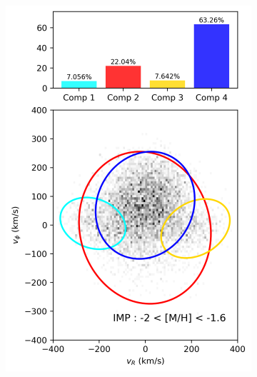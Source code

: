 \documentclass[a4paper,10pt]{article}
\begin{document}
\begin{multicols}{2}
\begin{figure}[t]
\begin{subfigure}[t]{0.245\textwidth}
    \centering\includegraphics[width=\linewidth]{../figures/gmm_IMP.png}
  \end{subfigure}\hfill
  \begin{subfigure}[t]{0.245\textwidth}

\end{subfigure}
\end{figure}
\end{multicols}
\end{document}
